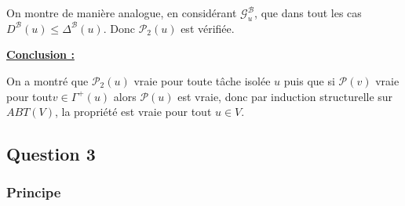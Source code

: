 \documentclass{article}
\begin{document}
On montre de manière analogue, en considérant $\mathcal{G}^{\mathcal{B}}_u$, que dans tout les cas $D^{\mathcal{B}}(u) \leq \Delta^{\mathcal{B}}(u)$. Donc $\mathcal{P}_2(u)$ est vérifiée.

\begin{flushleft}
    \bf
    \underline{Conclusion :}
\end{flushleft}
On a montré que $\mathcal{P}_2(u)$ vraie pour toute tâche isolée $u$ puis que si $\mathcal{P}(v)$ vraie pour tout$v \in \Gamma^{+}(u)$ alors $\mathcal{P}(u)$ est vraie, donc par induction structurelle sur $ABT(V)$, la propriété est vraie pour tout $u \in V$.
\subsection{Question 3}
\subsubsection{Principe}
\end{document}
